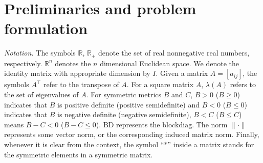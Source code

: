 \documentclass[journal,twoside,web]{ieeecolor}
\begin{document}
\section{Preliminaries and problem formulation}\label{secppf}
\emph{Notation.} The symbols $\mathbb{R}$, $\mathbb{R}_{+}$ denote the set of real nonnegative real numbers, respectively. $\mathbb{R}^{n}$ denotes the $n$ dimensional Euclidean space. We denote the identity matrix with appropriate dimension by $I$. Given a matrix $A=[a_{ij}]$, the symbols $A^{\top}$ refer to the transpose of $A$. For a square matrix $A$, $\lambda(A)$ refers to the set of eigenvalues of $A$. For symmetric metrics $B$ and $C$, $B>0$ ($B\geq 0$) indicates that $B$ is positive definite (positive semidefinite) and $B<0$ ($B\leq 0$) indicates that $B$ is negative definite (negative semidefinite), $B< C$ ($B\leq C$) means $B-C<0$ ($B-C\leq 0$). $\mathrm{BD}$ represents the $\mathrm{blockdiag}$. The norm $\|\cdot\|$ represents some vector norm, or the corresponding induced matrix norm. Finally, whenever it is clear from the context, the symbol ``$\ast$'' inside a matrix stands for the symmetric elements in a symmetric matrix.
\end{document}
